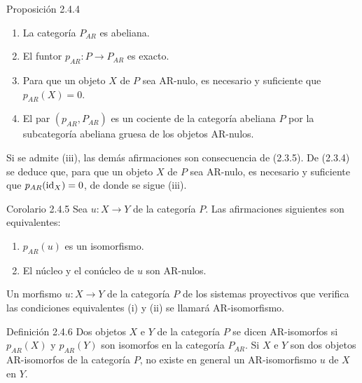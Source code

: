 \begin{statement}{Proposición 2.4.4}
\begin{enumerate}[label=(\roman*)]
\item La categoría $P_{AR}$ es abeliana.
\item El funtor $p_{AR}:P\to P_{AR}$ es exacto.
\item Para que un objeto $X$ de $P$ sea AR-nulo, es necesario y suficiente que $p_{AR}(X)=0$.
\item El par $(p_{AR},P_{AR})$ es un cociente de la categoría abeliana $P$ por la subcategoría abeliana gruesa de los objetos AR-nulos.
\end{enumerate}
\end{statement}

\begin{prooftext}[Demostración]
Si se admite (iii), las demás afirmaciones son consecuencia de (2.3.5). De (2.3.4) se deduce que, para que un objeto $X$ de $P$ sea AR-nulo, es necesario y suficiente que $p_{AR}(\operatorname{id}_X)=0$, de donde se sigue (iii).
\end{prooftext}

\begin{statement}{Corolario 2.4.5}
Sea $u:X\to Y$ de la categoría $P$. Las afirmaciones siguientes son equivalentes:
\begin{enumerate}[label=(\roman*)]
\item $p_{AR}(u)$ es un isomorfismo.
\item El núcleo y el conúcleo de $u$ son AR-nulos.
\end{enumerate}
Un morfismo $u:X\to Y$ de la categoría $P$ de los sistemas proyectivos que verifica las condiciones equivalentes (i) y (ii) se llamará AR-isomorfismo.
\end{statement}

\begin{statement}{Definición 2.4.6}
Dos objetos $X$ e $Y$ de la categoría $P$ se dicen AR-isomorfos si $p_{AR}(X)$ y $p_{AR}(Y)$ son isomorfos en la categoría $P_{AR}$. Si $X$ e $Y$ son dos objetos AR-isomorfos de la categoría $P$, no existe en general un AR-isomorfismo $u$ de $X$ en $Y$.
\end{statement}
